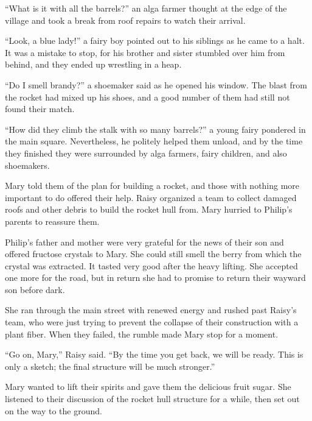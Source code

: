 \documentclass[10pt]{memoir}
\begin{document}
``What is it with all the barrels?'' an alga farmer thought at the edge of the
village and took a break from roof repairs to watch their arrival.

``Look, a blue lady!'' a fairy boy pointed out to his siblings as he came to a
halt. It was a mistake to stop, for his brother and sister stumbled over him
from behind, and they ended up wrestling in a heap.

``Do I smell brandy?'' a shoemaker said as he opened his window. The blast from
the rocket had mixed up his shoes, and a good number of them had still not
found their match.

``How did they climb the stalk with so many barrels?'' a young fairy pondered
in the main square. Nevertheless, he politely helped them unload, and by the
time they finished they were surrounded by alga farmers, fairy children, and
also shoemakers.

Mary told them of the plan for building a rocket, and those with nothing more
important to do offered their help. Raisy organized a team to collect damaged
roofs and other debris to build the rocket hull from. Mary hurried to Philip's
parents to reassure them.

Philip's father and mother were very grateful for the news of their son and
offered fructose crystals to Mary. She could still smell the berry from which
the crystal was extracted. It tasted very good after the heavy lifting. She
accepted one more for the road, but in return she had to promise to return
their wayward son before dark.

She ran through the main street with renewed energy and rushed past Raisy's
team, who were just trying to prevent the collapse of their construction with a
plant fiber. When they failed, the rumble made Mary stop for a moment.

``Go on, Mary,'' Raisy said. ``By the time you get back, we will be ready. This
is only a sketch; the final structure will be much stronger.''

Mary wanted to lift their spirits and gave them the delicious fruit sugar. She
listened to their discussion of the rocket hull structure for a while, then set
out on the way to the ground.
\end{document}
